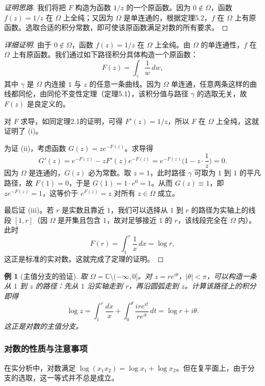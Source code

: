 \documentclass[UTF8]{ctexart}
\newtheorem{example}{例}[section]
\numberwithin{equation}{section}
\newcommand{\CC}{\mathbb{C}}
\begin{document}
\begin{proof}[证明思路]
我们将把 $F$ 构造为函数 $1/z$ 的一个原函数。因为 $0\notin\Omega$，函数 $f(z)=1/z$ 在 $\Omega$ 上全纯；又因为 $\Omega$ 是单连通的，根据定理5.2，$f$ 在 $\Omega$ 上有原函数。选取合适的积分常数，即可使该原函数满足对数的所有要求。
\end{proof}

\begin{proof}[详细证明]
由于 $0\notin\Omega$，函数 $f(z)=1/z$ 在 $\Omega$ 上全纯。由 $\Omega$ 的单连通性，$f$ 在 $\Omega$ 上有原函数。我们通过如下路径积分具体构造一个原函数：
\[
F(z) = \int_{\gamma} \frac{1}{w}\,dw ,
\]
其中 $\gamma$ 是 $\Omega$ 内连接 $1$ 与 $z$ 的任意一条曲线。因为 $\Omega$ 单连通，任意两条这样的曲线都同伦，由同伦不变性定理（定理5.1），该积分值与路径 $\gamma$ 的选取无关，故 $F(z)$ 是良定义的。

对 $F$ 求导，如同定理2.1的证明，可得 $F'(z)=1/z$，所以 $F$ 在 $\Omega$ 上全纯，这就证明了 (i)。

为证 (ii)，考虑函数 $G(z)=z e^{-F(z)}$。求导得
\[
G'(z) = e^{-F(z)} - z F'(z) e^{-F(z)} = e^{-F(z)}\bigl(1 - z\cdot\frac{1}{z}\bigr) = 0 .
\]
因为 $\Omega$ 是连通的，$G(z)$ 必为常数。取 $z=1$，此时路径 $\gamma$ 可取为 $1$ 到 $1$ 的平凡路径，故 $F(1)=0$，于是 $G(1)=1\cdot e^{0}=1$。从而 $G(z)\equiv1$，即 $z e^{-F(z)}=1$，这等价于 $e^{F(z)}=z$ 对所有 $z\in\Omega$ 成立。

最后证 (iii)。若 $r$ 是实数且靠近 $1$，我们可以选择从 $1$ 到 $r$ 的路径为实轴上的线段 $[1,r]$（因 $\Omega$ 是开集且包含 $1$，故对足够接近 $1$ 的 $r$，该线段完全在 $\Omega$ 内）。此时
\[
F(r) = \int_{1}^{r} \frac{1}{x}\,dx = \log r ,
\]
这正是标准的实对数。这就完成了定理的证明。
\end{proof}

\begin{example}[主值分支的验证]
取 $\Omega = \CC\setminus(-\infty,0]$。对 $z=re^{i\theta}$，$|\theta|<\pi$，可以构造一条从 $1$ 到 $z$ 的路径：先从 $1$ 沿实轴走到 $r$，再沿圆弧走到 $z$。计算该路径上的积分即得
\[
\log z = \int_1^r \frac{dx}{x} + \int_0^\theta \frac{i r e^{it}}{r e^{it}}\,dt = \log r + i\theta .
\]
这正是对数的主值分支。
\end{example}

\subsubsection{对数的性质与注意事项}

在实分析中，对数满足 $\log(x_1x_2)=\log x_1+\log x_2$。但在复平面上，由于分支的选取，这一等式并不总是成立。
\end{document}
